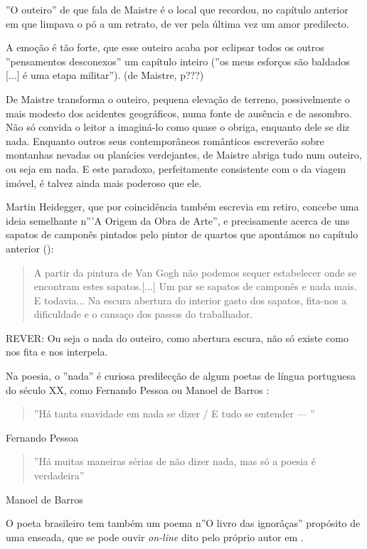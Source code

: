 \documentclass[12pt]{article}
\begin{document}
''O outeiro'' de que fala de Maistre é o local que recordou, no
capítulo anterior em que limpava o pó a um retrato, de ver pela última
vez um amor predilecto.

A emoção é tão forte, que esse outeiro acaba por eclipsar todos os
outros ''pensamentos desconexos'' um capítulo inteiro (''os meus
esforços são baldados [...] é uma etapa militar''). (de Maistre, p???)

De Maistre transforma o outeiro, pequena elevação de terreno,
possivelmente o mais modesto dos acidentes geográficos, numa fonte de
ausência e de assombro. Não só convida o leitor a imaginá-lo como
quase o obriga, enquanto dele se diz nada. Enquanto outros seus
contemporâneos românticos escreverão sobre montanhas nevadas ou
planícies verdejantes, de Maistre abriga tudo num outeiro, ou seja em
nada. E este paradoxo, perfeitamente consistente com o da viagem
imóvel, é talvez ainda mais poderoso que ele.

Martin Heidegger, que por coincidência também escrevia em retiro,
concebe uma ideia semelhante n'''A Origem da Obra de Arte'', e
precisamente acerca de uns sapatos de camponês pintados pelo pintor de
quartos que apontámos no capítulo anterior (\cite[p.24]{heidegger}):

\begin{quote}
  A partir da pintura de Van Gogh não podemos sequer estabelecer onde
  se encontram estes sapatos.[...] Um par se sapatos de camponês e
  nada mais. E todavia...  Na escura abertura do interior gasto dos
  sapatos, fita-nos a dificuldade e o cansaço dos passos do
  trabalhador.
\end{quote} 

REVER: Ou seja o nada do outeiro, como abertura escura, não só existe como
nos fita e nos interpela.

Na poesia, o ''nada'' é curiosa predilecção de algum poetas de língua
portuguesa do século XX, como Fernando Pessoa ou Manoel de Barros
\cite{manoel}:

\begin{quote}
  ''Há tanta suavidade em nada se dizer / E tudo se entender — ''
\end{quote}
Fernando Pessoa \cite{pessoa}


\begin{quote}
''Há muitas maneiras sérias de não dizer nada, mas só a poesia é verdadeira''
\end{quote}
Manoel de Barros \cite{manoelverso}

O poeta brasileiro tem também um poema n''O livro das ignorâças''
propósito de uma enseada, que se pode ouvir \emph{on-line} dito pelo
próprio autor em \cite{avidaebreve}.
\end{document}

